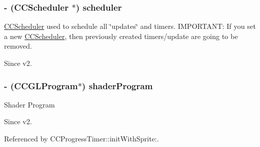 \hypertarget{class_c_c_node_a497798cf2d62b8b107069ff0fc1a07d0}{
\subsubsection[{scheduler}]{\setlength{\rightskip}{0pt plus 5cm}-\/ ({\bf C\-C\-Scheduler} $\ast$) {\bf scheduler}}}\label{class_c_c_node_a497798cf2d62b8b107069ff0fc1a07d0}
\hyperlink{class_c_c_scheduler}{C\-C\-Scheduler} used to schedule all \char`\"{}updates\char`\"{} and timers. I\-M\-P\-O\-R\-T\-A\-N\-T\-: If you set a new \hyperlink{class_c_c_scheduler}{C\-C\-Scheduler}, then previously created timers/update are going to be removed. \begin{DoxySince}{Since}
v2. 
\end{DoxySince}
\hypertarget{class_c_c_node_a6a14e4b8be7ff8fc766730abc73ce795}{
\subsubsection[{shader\-Program}]{\setlength{\rightskip}{0pt plus 5cm}-\/ ({\bf C\-C\-G\-L\-Program}$\ast$) {\bf shader\-Program}}}\label{class_c_c_node_a6a14e4b8be7ff8fc766730abc73ce795}
Shader Program \begin{DoxySince}{Since}
v2. 
\end{DoxySince}


Referenced by C\-C\-Progress\-Timer\-::init\-With\-Sprite\-:.

